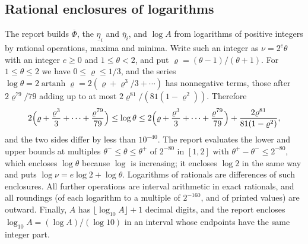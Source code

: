 \subsection{Rational enclosures of logarithms}
\label{subsec:log-enclosures}

The report builds \(\overline\Phi\), the \(\underline\eta_i\) and
\(\overline\eta_i\), and \(\log A\) from logarithms of positive integers by
rational operations, maxima and minima. Write such an integer as
\(\nu=2^e\theta\) with an integer \(e\ge0\) and \(1\le\theta<2\), and put
\(\varrho=(\theta-1)/(\theta+1)\). For \(1\le\theta\le2\) we have
\(0\le\varrho\le1/3\), and the series
\(\log\theta=2\operatorname{artanh}\varrho=2(\varrho+\varrho^3/3+\cdots)\)
has nonnegative terms, those after \(2\varrho^{79}/79\) adding up to at
most \(2\varrho^{81}/(81(1-\varrho^2))\). Therefore
\begin{equation}\label{eq:log-enclosure}
 2\Bigl(\varrho+\frac{\varrho^3}3+\cdots+\frac{\varrho^{79}}{79}\Bigr)
 \le\log\theta\le
 2\Bigl(\varrho+\frac{\varrho^3}3+\cdots+\frac{\varrho^{79}}{79}\Bigr)
 +\frac{2\varrho^{81}}{81(1-\varrho^2)},
\end{equation}
and the two sides differ by less than \(10^{-40}\). The report evaluates
the lower and upper bounds at multiples \(\theta^-\le\theta\le\theta^+\)
of \(2^{-80}\) in \([1,2]\) with \(\theta^+-\theta^-\le2^{-80}\), which
encloses \(\log\theta\) because \(\log\) is increasing; it encloses
\(\log2\) in the same way and puts \(\log\nu=e\log2+\log\theta\).
Logarithms of rationals are differences of such enclosures. All further
operations are interval arithmetic in exact rationals, and all roundings
(of each logarithm to a multiple of \(2^{-160}\), and of printed values)
are outward. Finally, \(A\) has
\(\lfloor\log_{10}A\rfloor+1\) decimal digits, and the report encloses
\(\log_{10}A=(\log A)/(\log10)\) in an interval whose endpoints have the
same integer part.
